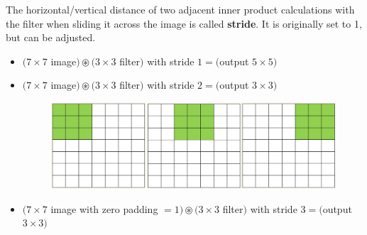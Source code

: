 \begin{concept}[5.6][Stride]
    The horizontal/vertical distance of two adjacent inner product calculations with the filter when sliding it across the image is called \textbf{stride}.
    It is originally set to 1, but can be adjusted.

    \begin{itemize}
        \item $(7 \times 7$ image$) \circledast(3 \times 3$ filter$)$ with stride $1=($output $5 \times 5)$
        \item
        $(7 \times 7$ image$) \circledast(3 \times 3$ filter$)$ with stride $2=($output $3 \times 3)$

        \begin{figure}[H]
            \centering
            \includegraphics[width=1.0\textwidth]{.././assets/5.5.png}
        \end{figure}
        \item $(7 \times 7$ image with zero padding $=1) \circledast(3 \times 3$ filter$)$ with stride $3=($output $3 \times 3)$
    \end{itemize}
\end{concept}


